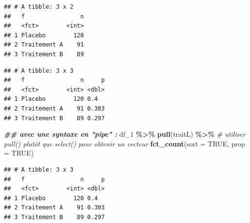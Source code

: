 \documentclass[
]{book}
\newenvironment{Shaded}{\begin{snugshade}}{\end{snugshade}}
\newcommand{\AttributeTok}[1]{\textcolor[rgb]{0.13,0.29,0.53}{#1}}
\newcommand{\CommentTok}[1]{\textcolor[rgb]{0.56,0.35,0.01}{\textit{#1}}}
\newcommand{\ConstantTok}[1]{\textcolor[rgb]{0.56,0.35,0.01}{#1}}
\newcommand{\DocumentationTok}[1]{\textcolor[rgb]{0.56,0.35,0.01}{\textbf{\textit{#1}}}}
\newcommand{\FunctionTok}[1]{\textcolor[rgb]{0.13,0.29,0.53}{\textbf{#1}}}
\newcommand{\NormalTok}[1]{#1}
\newcommand{\SpecialCharTok}[1]{\textcolor[rgb]{0.81,0.36,0.00}{\textbf{#1}}}
\begin{document}
\begin{Shaded}
\end{Shaded}

\begin{verbatim}
## # A tibble: 3 x 2
##   f                n
##   <fct>        <int>
## 1 Placebo        120
## 2 Traitement A    91
## 3 Traitement B    89
\end{verbatim}

\begin{Shaded}
\end{Shaded}

\begin{verbatim}
## # A tibble: 3 x 3
##   f                n     p
##   <fct>        <int> <dbl>
## 1 Placebo        120 0.4  
## 2 Traitement A    91 0.303
## 3 Traitement B    89 0.297
\end{verbatim}

\begin{Shaded}
\begin{Highlighting}[]
\DocumentationTok{\#\# avec une syntaxe en "pipe" :}
\NormalTok{df\_1 }\SpecialCharTok{\%\textgreater{}\%}
  \FunctionTok{pull}\NormalTok{(traitL) }\SpecialCharTok{\%\textgreater{}\%} \CommentTok{\# utiliser pull() plutôt que select() pour obtenir un vecteur}
  \FunctionTok{fct\_count}\NormalTok{(}\AttributeTok{sort =} \ConstantTok{TRUE}\NormalTok{, }\AttributeTok{prop =} \ConstantTok{TRUE}\NormalTok{)}
\end{Highlighting}
\end{Shaded}

\begin{verbatim}
## # A tibble: 3 x 3
##   f                n     p
##   <fct>        <int> <dbl>
## 1 Placebo        120 0.4  
## 2 Traitement A    91 0.303
## 3 Traitement B    89 0.297
\end{verbatim}
\end{document}
